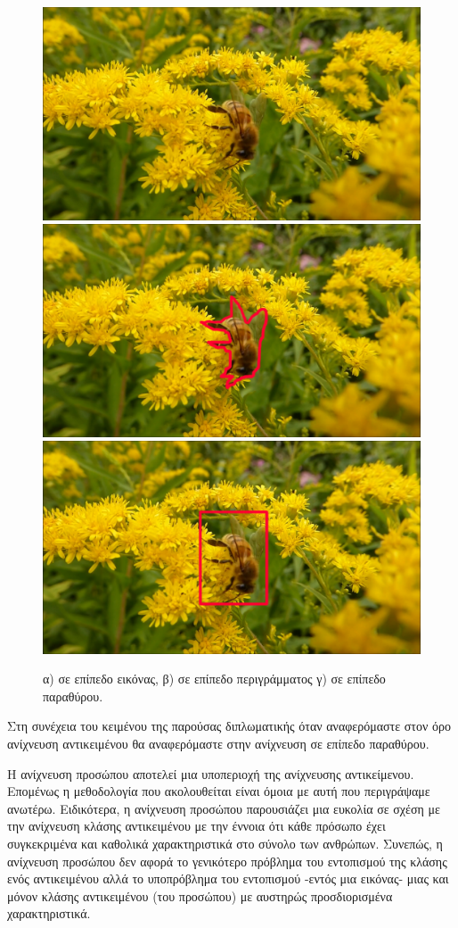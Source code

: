 \begin{figure}[htp]
    \centering
    \includegraphics[width=.49\textwidth]{../figures/bee.png}\hfill
    \includegraphics[width=.49\textwidth]{../figures/beescissors.png}\hfill
    \includegraphics[width=.48\textwidth]{../figures/beebbox.png}\hfill

    \caption{α) σε επίπεδο εικόνας, β) σε επίπεδο περιγράμματος γ) σε επίπεδο παραθύρου.}
    \label{fig:bee}

\end{figure}

Στη συνέχεια του κειμένου της παρούσας διπλωματικής όταν αναφερόμαστε στον όρο
ανίχνευση αντικειμένου θα αναφερόμαστε στην ανίχνευση σε επίπεδο παραθύρου.

Η ανίχνευση προσώπου αποτελεί μια υποπεριοχή της ανίχνευσης αντικείμενου. Επομένως
η μεθοδολογία που ακολουθείται είναι όμοια με αυτή που περιγράψαμε ανωτέρω. Ειδικότερα,
η ανίχνευση προσώπου παρουσιάζει μια ευκολία σε σχέση με την ανίχνευση κλάσης αντικειμένου
με την έννοια ότι κάθε πρόσωπο έχει συγκεκριμένα και καθολικά χαρακτηριστικά στο
σύνολο των ανθρώπων. Συνεπώς, η ανίχνευση προσώπου δεν αφορά το γενικότερο πρόβλημα
του εντοπισμού της κλάσης ενός αντικειμένου αλλά το υποπρόβλημα του εντοπισμού
-εντός μια εικόνας- μιας και μόνον κλάσης αντικειμένου (του προσώπου) με αυστηρώς
προσδιορισμένα χαρακτηριστικά.

